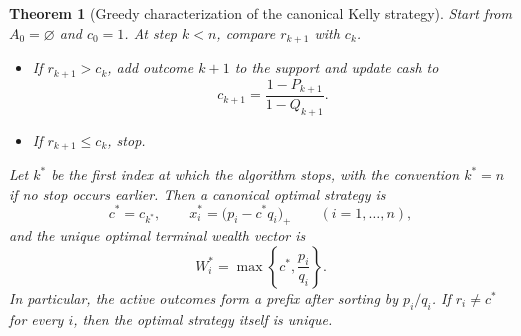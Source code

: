 \documentclass[11pt]{article}
\newtheorem{theorem}{Theorem}
\begin{document}
\begin{theorem}[Greedy characterization of the canonical Kelly strategy]\label{thm:greedy}
Start from $A_0=\varnothing$ and $c_0=1$. At step $k<n$, compare $r_{k+1}$ with $c_k$.
\begin{itemize}[leftmargin=2em]
  \item If $r_{k+1}>c_k$, add outcome $k+1$ to the support and update cash to
  \[
    c_{k+1}=\frac{1-P_{k+1}}{1-Q_{k+1}}.
  \]
  \item If $r_{k+1}\le c_k$, stop.
\end{itemize}
Let $k^*$ be the first index at which the algorithm stops, with the convention $k^*=n$ if no stop occurs earlier. Then a canonical optimal strategy is
\begin{equation}\label{eq:global-solution}
  c^*=c_{k^*},
  \qquad
  x_i^*=\bigl(p_i-c^*q_i\bigr)_+ \qquad (i=1,\dots,n),
\end{equation}
and the unique optimal terminal wealth vector is
\begin{equation}\label{eq:wealth-floor}
  W_i^*=\max\!\left\{c^*,\frac{p_i}{q_i}\right\}.
\end{equation}
In particular, the active outcomes form a prefix after sorting by $p_i/q_i$. If $r_i\ne c^*$ for every $i$, then the optimal strategy itself is unique.
\end{theorem}
\end{document}

